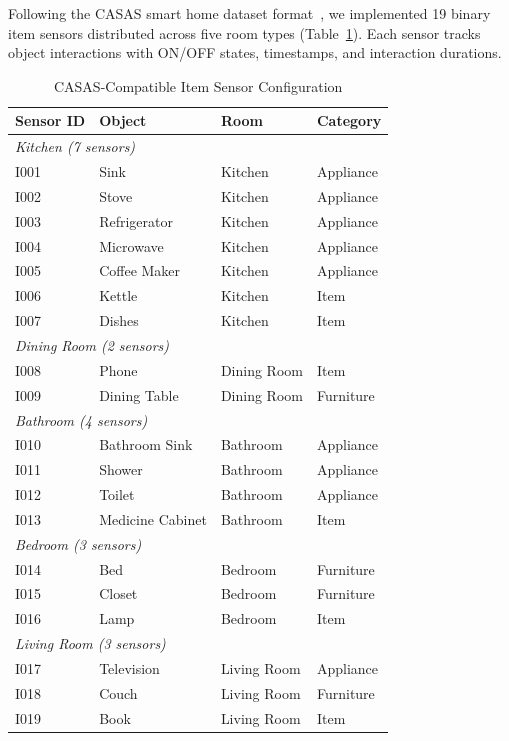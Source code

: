 \documentclass[conference]{IEEEtran}
\begin{document}
Following the CASAS smart home dataset format~\cite{cook2012casas}, we implemented 19 binary item sensors distributed across five room types (Table~\ref{tab:item_sensors}). Each sensor tracks object interactions with ON/OFF states, timestamps, and interaction durations.

\begin{table}[t]
\centering
\caption{CASAS-Compatible Item Sensor Configuration}
\label{tab:item_sensors}
\begin{tabular}{@{}llll@{}}
\toprule
\textbf{Sensor ID} & \textbf{Object} & \textbf{Room} & \textbf{Category} \\
\midrule
\multicolumn{4}{l}{\textit{Kitchen (7 sensors)}} \\
I001 & Sink & Kitchen & Appliance \\
I002 & Stove & Kitchen & Appliance \\
I003 & Refrigerator & Kitchen & Appliance \\
I004 & Microwave & Kitchen & Appliance \\
I005 & Coffee Maker & Kitchen & Appliance \\
I006 & Kettle & Kitchen & Item \\
I007 & Dishes & Kitchen & Item \\
\midrule
\multicolumn{4}{l}{\textit{Dining Room (2 sensors)}} \\
I008 & Phone & Dining Room & Item \\
I009 & Dining Table & Dining Room & Furniture \\
\midrule
\multicolumn{4}{l}{\textit{Bathroom (4 sensors)}} \\
I010 & Bathroom Sink & Bathroom & Appliance \\
I011 & Shower & Bathroom & Appliance \\
I012 & Toilet & Bathroom & Appliance \\
I013 & Medicine Cabinet & Bathroom & Item \\
\midrule
\multicolumn{4}{l}{\textit{Bedroom (3 sensors)}} \\
I014 & Bed & Bedroom & Furniture \\
I015 & Closet & Bedroom & Furniture \\
I016 & Lamp & Bedroom & Item \\
\midrule
\multicolumn{4}{l}{\textit{Living Room (3 sensors)}} \\
I017 & Television & Living Room & Appliance \\
I018 & Couch & Living Room & Furniture \\
I019 & Book & Living Room & Item \\
\bottomrule
\end{tabular}
\end{table}
\end{document}
